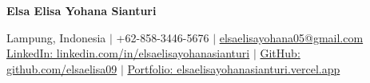 \documentclass[10pt,a4paper]{extarticle}
\newcommand{\cvname}[1]{\begin{center}\LARGE\bfseries #1\end{center}}
\newcommand{\cvrole}[1]{\begin{center}\large #1\end{center}}
\newcommand{\cvcontact}[1]{\begin{center}\small #1\end{center}}
\newcommand{\lang}{punyaelsa}
\begin{document}
\pagestyle{empty}

\cvname{Elsa Elisa Yohana Sianturi}
\cvcontact{Lampung, Indonesia $|$ +62-858-3446-5676 $|$ \href{mailto:elsaelisayohana05@gmail.com}{elsaelisayohana05@gmail.com}\\
\href{https://linkedin.com/in/elsaelisayohanasianturi}{LinkedIn: linkedin.com/in/elsaelisayohanasianturi} $|$
\href{https://github.com/elsaelisa09}{GitHub: github.com/elsaelisa09} $|$
\href{https://elsaelisayohanasianturi.vercel.app/}{Portfolio: elsaelisayohanasianturi.vercel.app}}

\vspace{0.4cm}


\end{document}
